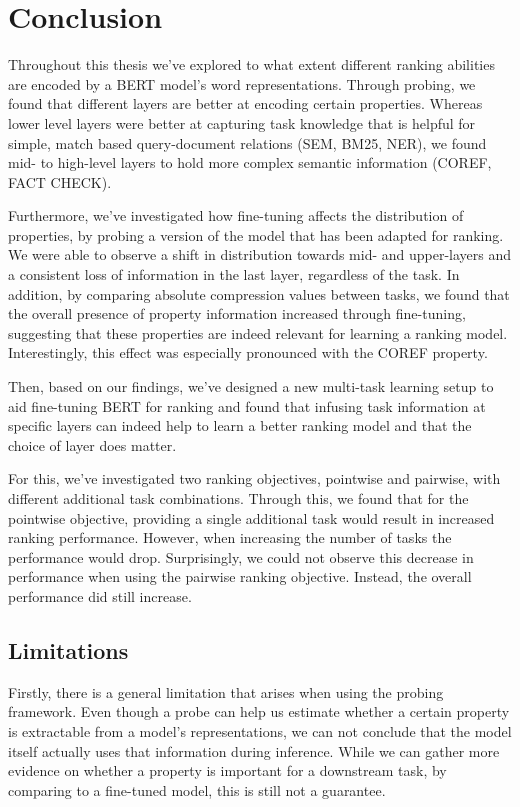 \chapter{Conclusion}
\label{chap:conclusion}
Throughout this thesis we've explored to what extent different ranking abilities are encoded by a BERT model's word representations. Through probing, we found that different layers are better at encoding certain properties. Whereas lower level layers were better at capturing task knowledge that is helpful for simple, match based query-document relations (SEM, BM25, NER), we found mid- to high-level layers to hold more complex semantic information (COREF, FACT CHECK).

Furthermore, we've investigated how fine-tuning affects the distribution of properties, by probing a version of the model that has been adapted for ranking. We were able to observe a shift in distribution towards mid- and upper-layers and a consistent loss of information in the last layer, regardless of the task. In addition, by comparing absolute compression values between tasks, we found that the overall presence of property information increased through fine-tuning, suggesting that these properties are indeed relevant for learning a ranking model. Interestingly, this effect was especially pronounced with the COREF property.

Then, based on our findings, we've designed a new multi-task learning setup to aid fine-tuning BERT for ranking and found that infusing task information at specific layers can indeed help to learn a better ranking model and that the choice of layer does matter.

For this, we've investigated two ranking objectives, pointwise and pairwise, with different additional task combinations. Through this, we found that for the pointwise objective, providing a single additional task would result in increased ranking performance. However, when increasing the number of tasks the performance would drop. Surprisingly, we could not observe this decrease in performance when using the pairwise ranking objective. Instead, the overall performance did still increase.

\section{Limitations}
\label{sec:limitations}
Firstly, there is a general limitation that arises when using the probing framework. Even though a probe can help us estimate whether a certain property is extractable from a model's representations, we can not conclude that the model itself actually uses that information during inference. While we can gather more evidence on whether a property is important for a downstream task, by comparing to a fine-tuned model, this is still not a guarantee.

